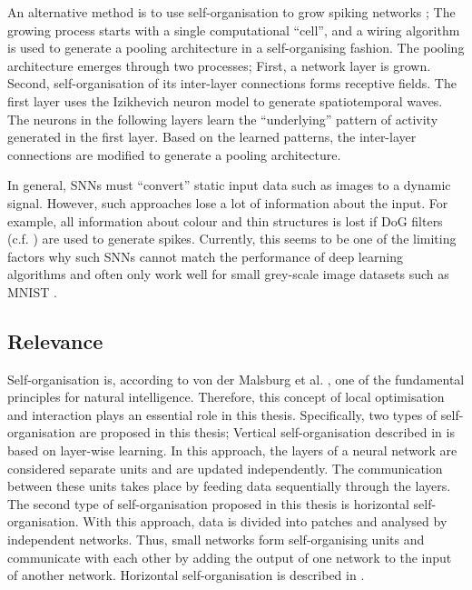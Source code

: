 An alternative method is to use self-organisation to grow spiking networks ; The growing process starts with a single computational ``cell'', and a wiring algorithm is used to generate a pooling architecture in a self-organising fashion.
The pooling architecture emerges through two processes; First, a network layer is grown. Second, self-organisation of its inter-layer connections forms receptive fields.
The first layer uses the Izikhevich neuron model  to generate spatiotemporal waves.
The neurons in the following layers learn the ``underlying'' pattern of activity generated in the first layer. 
Based on the learned patterns, the inter-layer connections are modified to generate a pooling architecture.

In general, SNNs must ``convert'' static input data such as images to a dynamic signal. However, such approaches lose a lot of information about the input.
For example, all information about colour and thin structures is lost if DoG filters (c.f. ) are used to generate spikes.
Currently, this seems to be one of the limiting factors why such SNNs cannot match the performance of deep learning algorithms and often only work well for small grey-scale image datasets such as MNIST \cite{Lecun_Bottou_Bengio_Haffner_1998}.



\subsection{Relevance}
Self-organisation is, according to von der Malsburg et al. , one of the fundamental principles for natural intelligence.
Therefore, this concept of local optimisation and interaction plays an essential role in this thesis.
Specifically, two types of self-organisation are proposed in this thesis;
Vertical self-organisation described in  is based on layer-wise learning. In this approach, the layers of a neural network are considered separate units and are updated independently.
The communication between these units takes place by feeding data sequentially through the layers.
The second type of self-organisation proposed in this thesis is horizontal self-organisation. With this approach, data is divided into patches and analysed by independent networks. Thus, small networks form self-organising units and communicate with each other by adding the output of one network to the input of another network.
Horizontal self-organisation is described in .



